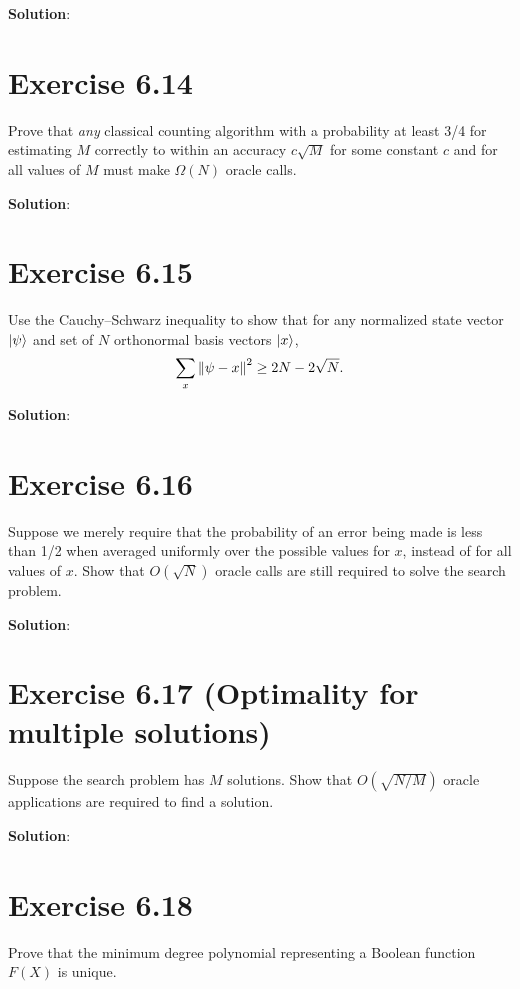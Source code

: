 \documentclass{book}
\begin{document}
        \textbf{Solution}:
    
    \section*{Exercise 6.14}
        Prove that \emph{any} classical counting algorithm with a probability at least 3/4 for estimating $M$ correctly to within an accuracy $c\sqrt{M}$ for some constant $c$ and for all values of $M$ must make $\Omega (N)$ oracle calls. 
        
        \textbf{Solution}:
    
    \section*{Exercise 6.15}
        Use the Cauchy–Schwarz inequality to show that for any normalized state vector $\ket{\psi}$ and set of $N$ orthonormal basis vectors $\ket{x}$,
        \begin{align}
            \sum_x \norm{\psi -x}^2 \geq 2N-2\sqrt{N}.
        \end{align}
        
        \textbf{Solution}:
        
    \section*{Exercise 6.16}
        Suppose we merely require that the probability of an error being made is less than 1/2 when averaged uniformly over the possible values for $x$, instead of for all values of $x$. Show that $O(\sqrt{N})$ oracle calls are still required to solve the search problem. 
        
        \textbf{Solution}:
        
    \section*{Exercise 6.17 (Optimality for multiple solutions)}
        Suppose the search problem has $M$ solutions. Show that $O(\sqrt{N/M})$ oracle applications are required to find a solution. 
        
        \textbf{Solution}:
        
    \section*{Exercise 6.18}
        Prove that the minimum degree polynomial representing a Boolean function $F(X)$ is unique. 
        
\end{document}
